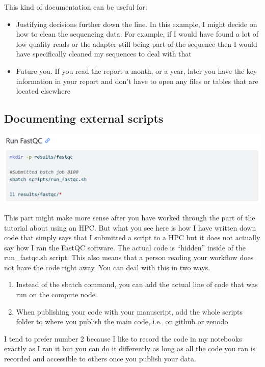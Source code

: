 \documentclass[
  letterpaper,
  DIV=11,
  numbers=noendperiod]{scrreprt}
\providecommand{\tightlist}{%
  \setlength{\itemsep}{0pt}\setlength{\parskip}{0pt}}\usepackage{longtable,booktabs,array}
\begin{document}
This kind of documentation can be useful for:

\begin{itemize}
\tightlist
\item
  Justifying decisions further down the line. In this example, I might
  decide on how to clean the sequencing data. For example, if I would
  have found a lot of low quality reads or the adapter still being part
  of the sequence then I would have specifically cleaned my sequences to
  deal with that
\item
  Future you. If you read the report a month, or a year, later you have
  the key information in your report and don't have to open any files or
  tables that are located elsewhere
\end{itemize}

\subsection{Documenting external
scripts}\label{documenting-external-scripts}

\includegraphics[width=5.82292in,height=\textheight]{../img/external_scripts.png}

This part might make more sense after you have worked through the part
of the tutorial about using an HPC. But what you see here is how I have
written down code that simply says that I submitted a script to a HPC
but it does not actually say how I ran the FastQC software. The actual
code is ``hidden'' inside of the run\_fastqc.sh script. This also means
that a person reading your workflow does not have the code right away.
You can deal with this in two ways.

\begin{enumerate}
\def\labelenumi{\arabic{enumi}.}
\tightlist
\item
  Instead of the sbatch command, you can add the actual line of code
  that was run on the compute node.
\item
  When publishing your code with your manuscript, add the whole scripts
  folder to where you publish the main code, i.e.~on
  \href{https://github.com/ndombrowski/cli_workshop/tree/main/example_doc}{github}
  or \href{https://zenodo.org/records/3839790}{zenodo}
\end{enumerate}

I tend to prefer number 2 because I like to record the code in my
notebooks exactly as I ran it but you can do it differently as long as
all the code you ran is recorded and accessible to others once you
publish your data.
\end{document}
